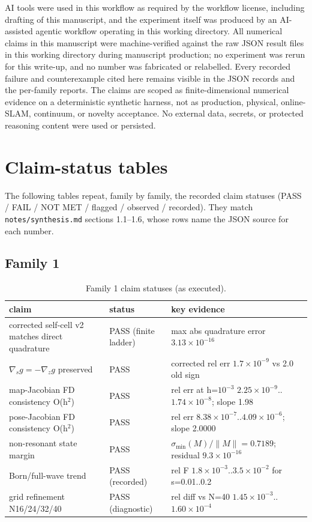 \documentclass[12pt]{article}
\begin{document}
AI tools were used in this workflow as required by the workflow license,
including drafting of this manuscript, and the experiment itself was produced
by an AI-assisted agentic workflow operating in this working directory. All
numerical claims in this manuscript were machine-verified against the raw JSON
result files in this working directory during manuscript production; no
experiment was rerun for this write-up, and no number was fabricated or
relabelled. Every recorded failure and counterexample cited here remains
visible in the JSON records and the per-family reports. The claims are scoped
as finite-dimensional numerical evidence on a deterministic synthetic harness,
not as production, physical, online-SLAM, continuum, or novelty acceptance.
No external data, secrets, or protected reasoning content were used or
persisted.

\appendix
\section{Claim-status tables}\label{app:claims}

The following tables repeat, family by family, the recorded claim statuses
(PASS / FAIL / NOT MET / flagged / observed / recorded). They match
\texttt{notes/synthesis.md} sections 1.1--1.6, whose rows name the JSON source for
each number.

\subsection{Family 1}
\begin{table}[ht]
\centering
\small
\caption{Family 1 claim statuses (as executed).}
\label{app:tab:f1}
\begin{tabular}{p{} p{} p{}}
\toprule
claim & status & key evidence \\
\midrule
corrected self-cell v2 matches direct quadrature & PASS (finite ladder) &
max abs quadrature error $3.13\times10^{-16}$ \\
$\nabla_s g=-\nabla_z g$ preserved & PASS &
corrected rel err $1.7\times10^{-9}$ vs 2.0 old sign \\
map-Jacobian FD consistency O(h$^2$) & PASS &
rel err at h=$10^{-3}$ $2.25\times10^{-9}$..$1.74\times10^{-8}$; slope 1.98 \\
pose-Jacobian FD consistency O(h$^2$) & PASS &
rel err $8.38\times10^{-7}$..$4.09\times10^{-6}$; slope 2.0000 \\
non-resonant state margin & PASS &
$\sigma_{\min}(M)/\|M\|=0.7189$; residual $9.3\times10^{-16}$ \\
Born/full-wave trend & PASS (recorded) &
rel F $1.8\times10^{-3}$..$3.5\times10^{-2}$ for s=0.01..0.2 \\
grid refinement N16/24/32/40 & PASS (diagnostic) &
rel diff vs N=40 $1.45\times10^{-3}$..$1.60\times10^{-4}$ \\
\bottomrule
\end{tabular}
\end{table}
\end{document}

